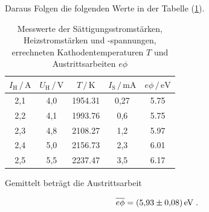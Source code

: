 Daraus Folgen die folgenden Werte in der Tabelle (\ref{tab:mess3}).

\begin{table}
    \centering
    \caption{Messwerte der Sättigungsstromstärken, Heizstromstärken und -spannungen, errechneten
            Kathodentemperaturen $T$ und Austrittsarbeiten $e\phi$}
    \label{tab:mess3}
    \begin{tabular}{c c c c c}
    \toprule
    $I_\text{H} \,/\, \si{\ampere} $ & $U_\text{H} \,/\, \si{\volt}$ & $T \,/\, \si{\kelvin}$
    & $I_\text{S} \,/\, \si{\milli\ampere} $ & $e\phi \,/\, \si{\eV} $\\
    \midrule 
      2,1 & 4,0 & 1954.31 & 0,27& 5.75 \\
      2,2 & 4,1 & 1993.76 & 0,6 & 5.75 \\
      2,3 & 4,8 & 2108.27 & 1,2 & 5.97 \\
      2,4 & 5,0 & 2156.73 & 2,3 & 6.01 \\
      2,5 & 5,5 & 2237.47 & 3,5 & 6.17  \\
    \bottomrule
    \end{tabular}
    \end{table}
  
 Gemittelt beträgt die Austrittsarbeit
  
  \begin{equation*}
      \overline{e\phi} = \SI{5.93 +- 0.08}{\eV} \; .
  \end{equation*}